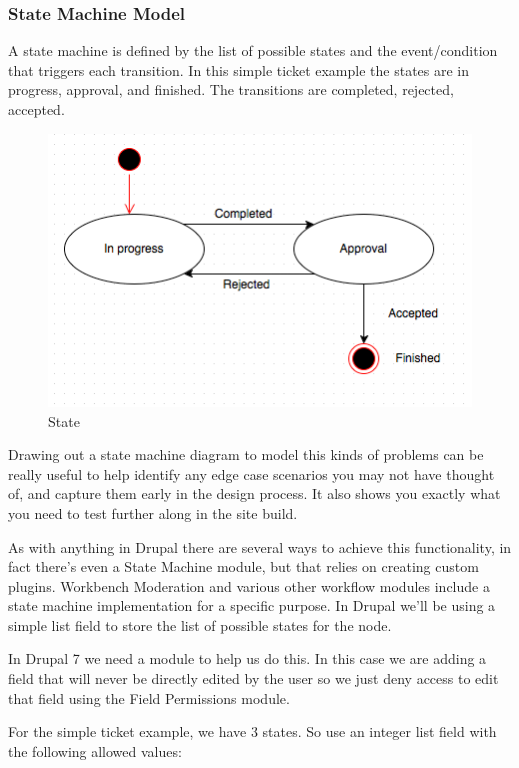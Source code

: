 \subsubsection{State Machine Model}

A state machine is defined by the list of possible states and the event/condition that triggers each transition. In this simple ticket example the states are in progress, approval, and finished. The transitions are completed, rejected, accepted. 

\begin{figure}[H]
\centering
\includegraphics[width=14cm]{Chapter2/state.png}
\caption{State}
\label{fig:state}
\end{figure}

Drawing out a state machine diagram to model this kinds of problems can be really useful to help identify any edge case scenarios you may not have thought of, and capture them early in the design process. It also shows you exactly what you need to test further along in the site build.
	
As with anything in Drupal there are several ways to achieve this functionality, in fact there’s even a State Machine module, but that relies on creating custom plugins. Workbench Moderation and various other workflow modules include a state machine implementation for a specific purpose. In Drupal we’ll be using a simple list field to store the list of possible states for the node.

In Drupal 7 we need a module to help us do this. In this case we are adding a field that will never be directly edited by the user so we just deny access to edit that field using the Field Permissions module.

For the simple ticket example, we have 3 states. So use an integer list field with the following allowed values:

